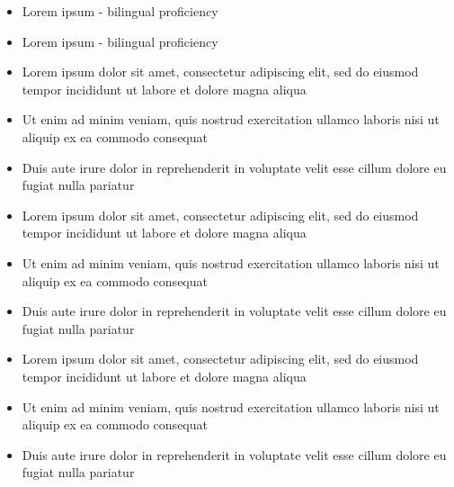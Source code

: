 \documentclass{resume_template}
\begin{document}
\begin{tcbraster}[grid]
\begin{tcolorbox}[sidebar,raster multicolumn=2]
				\vspace*{-24pt}
				\begin{itemize}
					\item[] Lorem ipsum - bilingual proficiency
					\item[] Lorem ipsum - bilingual proficiency
				\end{itemize}
		\end{tcolorbox}
		\begin{tcolorbox}[main,raster multicolumn=4]
				\begin{itemize}
					\item Lorem ipsum dolor sit amet, consectetur adipiscing elit, sed do eiusmod tempor incididunt ut labore et dolore magna aliqua
					\item Ut enim ad minim veniam, quis nostrud exercitation ullamco laboris nisi ut aliquip ex ea commodo consequat
					\item Duis aute irure dolor in reprehenderit in voluptate velit esse cillum dolore eu fugiat nulla pariatur
				\end{itemize}
				\begin{itemize}
					\item Lorem ipsum dolor sit amet, consectetur adipiscing elit, sed do eiusmod tempor incididunt ut labore et dolore magna aliqua
					\item Ut enim ad minim veniam, quis nostrud exercitation ullamco laboris nisi ut aliquip ex ea commodo consequat
					\item Duis aute irure dolor in reprehenderit in voluptate velit esse cillum dolore eu fugiat nulla pariatur
				\end{itemize}
						
				\begin{itemize}
					\item Lorem ipsum dolor sit amet, consectetur adipiscing elit, sed do eiusmod tempor incididunt ut labore et dolore magna aliqua
					\item Ut enim ad minim veniam, quis nostrud exercitation ullamco laboris nisi ut aliquip ex ea commodo consequat
					\item Duis aute irure dolor in reprehenderit in voluptate velit esse cillum dolore eu fugiat nulla pariatur
				\end{itemize}			
		\end{tcolorbox}
	\end{tcbraster}
\end{document}
